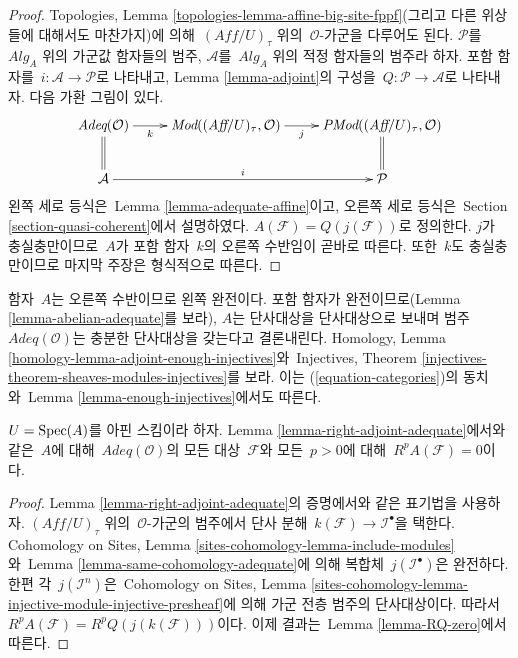 \begin{proof}
Topologies, Lemma \ref{topologies-lemma-affine-big-site-fppf}(그리고 다른
위상들에 대해서도 마찬가지)에 의해\  $(\textit{Aff}/U)_\tau$ 위의\ 
$\mathcal{O}$-가군을 다루어도 된다. $\mathcal{P}$를\ 
$\textit{Alg}_A$ 위의 가군값 함자들의 범주, $\mathcal{A}$를\ 
$\textit{Alg}_A$ 위의 적정 함자들의 범주라 하자. 포함 함자를\ 
$i : \mathcal{A} \to \mathcal{P}$로 나타내고, Lemma
\ref{lemma-adjoint}의 구성을\  $Q : \mathcal{P} \to \mathcal{A}$로
나타내자. 다음 가환 그림이 있다.
\begin{equation}
\label{equation-categories}
\vcenter{
\xymatrix{
\textit{Adeq}(\mathcal{O}) \ar[r]_-k \ar@{=}[d] &
\textit{Mod}((\textit{Aff}/U)_\tau, \mathcal{O}) \ar[r]_-j &
\textit{PMod}((\textit{Aff}/U)_\tau, \mathcal{O}) \ar@{=}[d] \\
\mathcal{A} \ar[rr]^-i & & \mathcal{P}
}
}
\end{equation}
왼쪽 세로 등식은\  Lemma \ref{lemma-adequate-affine}이고, 오른쪽 세로
등식은\  Section \ref{section-quasi-coherent}에서 설명하였다.
$A(\mathcal{F}) = Q(j(\mathcal{F}))$로 정의한다. $j$가 충실충만이므로\ 
$A$가 포함 함자\  $k$의 오른쪽 수반임이 곧바로 따른다. 또한\  $k$도
충실충만이므로 마지막 주장은 형식적으로 따른다.
\end{proof}

\noindent
함자\  $A$는 오른쪽 수반이므로 왼쪽 완전이다. 포함 함자가
완전이므로(Lemma \ref{lemma-abelian-adequate}를 보라), $A$는
단사대상을 단사대상으로 보내며 범주\  $\textit{Adeq}(\mathcal{O})$는
충분한 단사대상을 갖는다고 결론내린다. Homology, Lemma
\ref{homology-lemma-adjoint-enough-injectives}와\  Injectives, Theorem
\ref{injectives-theorem-sheaves-modules-injectives}를 보라. 이는
(\ref{equation-categories})의 동치와\  Lemma
\ref{lemma-enough-injectives}에서도 따른다.

\begin{lemma}
\label{lemma-RA-zero}
$U = \mathop{\mathrm{Spec}}(A)$를 아핀 스킴이라 하자. Lemma
\ref{lemma-right-adjoint-adequate}에서와 같은\  $A$에 대해\ 
$\textit{Adeq}(\mathcal{O})$의 모든 대상\  $\mathcal{F}$와
모든\  $p > 0$에 대해\  $R^pA(\mathcal{F}) = 0$이다.
\end{lemma}

\begin{proof}
Lemma \ref{lemma-right-adjoint-adequate}의 증명에서와 같은 표기법을
사용하자. $(\textit{Aff}/U)_\tau$ 위의\  $\mathcal{O}$-가군의
범주에서 단사 분해\  $k(\mathcal{F}) \to \mathcal{I}^\bullet$을
택한다. Cohomology on Sites, Lemma
\ref{sites-cohomology-lemma-include-modules}와\  Lemma
\ref{lemma-same-cohomology-adequate}에 의해 복합체\ 
$j(\mathcal{I}^\bullet)$은 완전하다. 한편 각\ 
$j(\mathcal{I}^n)$은\  Cohomology on Sites, Lemma
\ref{sites-cohomology-lemma-injective-module-injective-presheaf}에 의해
가군 전층 범주의 단사대상이다. 따라서\ 
$R^pA(\mathcal{F}) = R^pQ(j(k(\mathcal{F})))$이다. 이제 결과는\ 
Lemma \ref{lemma-RQ-zero}에서 따른다.
\end{proof}

